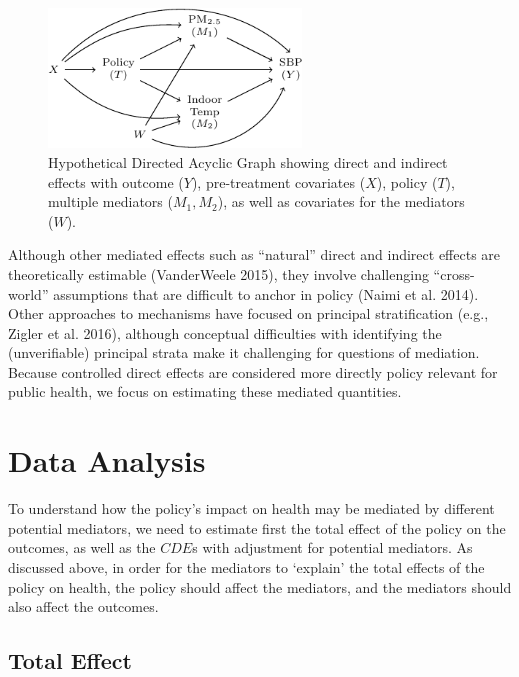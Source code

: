 \documentclass[
  letterpaper,
  DIV=11,
  numbers=noendperiod]{scrartcl}
\begin{document}
\begin{figure}[H]

{\centering \includegraphics[width=0.6\textwidth,height=\textheight]{hei-report_files/figure-pdf/fig-dag1-1.pdf}

}

\caption{\label{fig-dag1}Hypothetical Directed Acyclic Graph showing
direct and indirect effects with outcome (\(Y\)), pre-treatment
covariates (\(X\)), policy (\(T\)), multiple mediators
(\(M_{1},M_{2}\)), as well as covariates for the mediators (\(W\)).}

\end{figure}

Although other mediated effects such as ``natural'' direct and indirect
effects are theoretically estimable (VanderWeele 2015), they involve
challenging ``cross-world'' assumptions that are difficult to anchor in
policy (Naimi et al. 2014). Other approaches to mechanisms have focused
on principal stratification (e.g., Zigler et al. 2016), although
conceptual difficulties with identifying the (unverifiable) principal
strata make it challenging for questions of mediation. Because
controlled direct effects are considered more directly policy relevant
for public health, we focus on estimating these mediated quantities.

\hypertarget{data-analysis}{%
\section{Data Analysis}\label{data-analysis}}

To understand how the policy's impact on health may be mediated by
different potential mediators, we need to estimate first the total
effect of the policy on the outcomes, as well as the \(CDE\)s with
adjustment for potential mediators. As discussed above, in order for the
mediators to `explain' the total effects of the policy on health, the
policy should affect the mediators, and the mediators should also affect
the outcomes.

\hypertarget{total-effect}{%
\subsection{Total Effect}\label{total-effect}}
\end{document}
